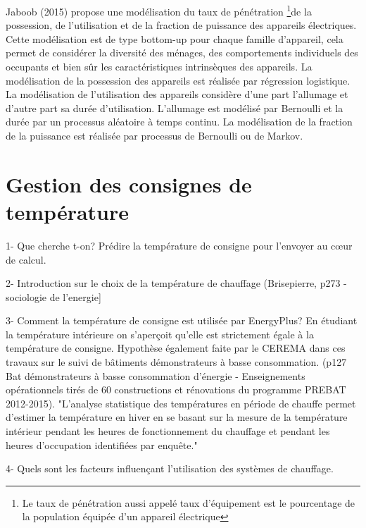 Jaboob (2015) propose une modélisation du taux de pénétration \footnote{Le taux de pénétration aussi appelé taux d'équipement est le pourcentage de la population équipée d'un appareil électrique}de la possession, de l'utilisation et de la fraction de puissance des appareils électriques. Cette modélisation est de type bottom-up pour chaque famille d'appareil, cela permet de considérer la diversité des ménages, des comportements individuels des occupants et bien sûr les caractéristiques intrinsèques des appareils. La modélisation de la possession des appareils est réalisée par régression logistique. La modélisation de l'utilisation des appareils considère d'une part l'allumage et d'autre part sa durée d'utilisation. L'allumage est modélisé par Bernoulli et la durée par un processus aléatoire à temps continu. La modélisation de la fraction de la puissance est réalisée par processus de Bernoulli ou de Markov.

\section{Gestion des consignes de température}

1- Que cherche t-on? Prédire la température de consigne pour l'envoyer au cœur de calcul.

2- Introduction sur le choix de la température de chauffage (Brisepierre, p273 - sociologie de l'energie]

3- Comment la température de consigne est utilisée par EnergyPlus? En étudiant la température intérieure on s'aperçoit qu'elle est strictement égale à la température de consigne. Hypothèse également faite par le CEREMA dans ces travaux sur le suivi de bâtiments démonstrateurs à basse consommation. (p127  Bat démonstrateurs à basse consommation d'énergie - Enseignements opérationnels tirés de 60 constructions et rénovations du programme PREBAT 2012-2015). "L'analyse statistique des températures en période de chauffe permet d'estimer la température en hiver en se basant sur la mesure de la température intérieur pendant les heures de fonctionnement du chauffage et pendant les heures d'occupation identifiées par enquête."

4- Quels sont les facteurs influençant l'utilisation des systèmes de chauffage.

